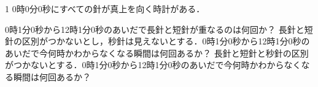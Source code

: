 1
0時0分0秒にすべての針が真上を向く時計がある．
\begin{qlist}
  \qitem 0時1分0秒から12時1分0秒のあいだで長針と短針が重なるのは何回か？
  \qitem 長針と短針の区別がつかないとし，秒針は見えないとする．0時1分0秒から12時1分0秒のあいだで今何時かわからなくなる瞬間は何回あるか？
  \qitem 長針と短針と秒針の区別がつかないとする．0時1分0秒から12時1分0秒のあいだで今何時かわからなくなる瞬間は何回あるか？
\end{qlist}

